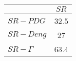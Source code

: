 \begin{tabular}{l|c}
\toprule
{} &  $SR$ \\
\midrule
\textbf{$SR-PDG$   } &  32.5 \\
\textbf{$SR-Deng$  } &    27 \\
\textbf{$SR-\Gamma$} &  63.4 \\
\bottomrule
\end{tabular}
